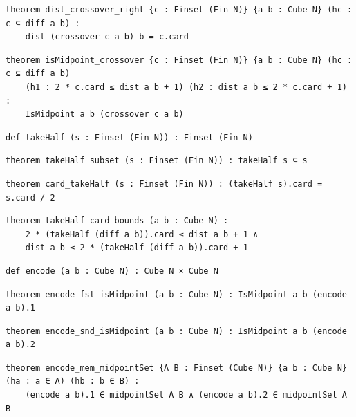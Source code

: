 \begin{lstlisting}[style=leancat]
theorem dist_crossover_right {c : Finset (Fin N)} {a b : Cube N} (hc : c ⊆ diff a b) :
    dist (crossover c a b) b = c.card
\end{lstlisting}

\begin{lstlisting}[style=leancat]
theorem isMidpoint_crossover {c : Finset (Fin N)} {a b : Cube N} (hc : c ⊆ diff a b)
    (h1 : 2 * c.card ≤ dist a b + 1) (h2 : dist a b ≤ 2 * c.card + 1) :
    IsMidpoint a b (crossover c a b)
\end{lstlisting}

\begin{lstlisting}[style=leancat]
def takeHalf (s : Finset (Fin N)) : Finset (Fin N)
\end{lstlisting}

\begin{lstlisting}[style=leancat]
theorem takeHalf_subset (s : Finset (Fin N)) : takeHalf s ⊆ s
\end{lstlisting}

\begin{lstlisting}[style=leancat]
theorem card_takeHalf (s : Finset (Fin N)) : (takeHalf s).card = s.card / 2
\end{lstlisting}

\begin{lstlisting}[style=leancat]
theorem takeHalf_card_bounds (a b : Cube N) :
    2 * (takeHalf (diff a b)).card ≤ dist a b + 1 ∧
    dist a b ≤ 2 * (takeHalf (diff a b)).card + 1
\end{lstlisting}

\begin{lstlisting}[style=leancat]
def encode (a b : Cube N) : Cube N × Cube N
\end{lstlisting}

\begin{lstlisting}[style=leancat]
theorem encode_fst_isMidpoint (a b : Cube N) : IsMidpoint a b (encode a b).1
\end{lstlisting}

\begin{lstlisting}[style=leancat]
theorem encode_snd_isMidpoint (a b : Cube N) : IsMidpoint a b (encode a b).2
\end{lstlisting}

\begin{lstlisting}[style=leancat]
theorem encode_mem_midpointSet {A B : Finset (Cube N)} {a b : Cube N} (ha : a ∈ A) (hb : b ∈ B) :
    (encode a b).1 ∈ midpointSet A B ∧ (encode a b).2 ∈ midpointSet A B
\end{lstlisting}

